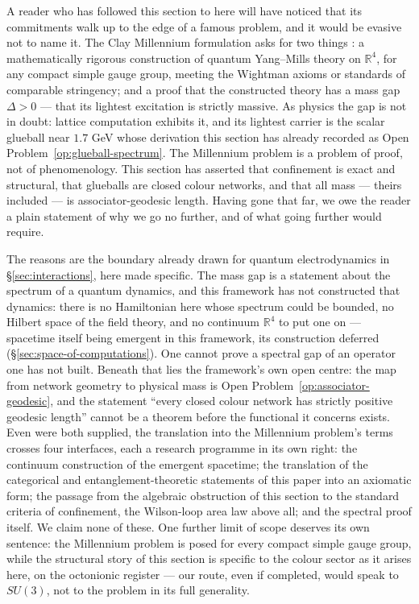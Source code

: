 A reader who has followed this section to here will have noticed that its commitments walk up to
the edge of a famous problem, and it would be evasive not to name it. The Clay Millennium
formulation asks for two things \autocite{jaffewitten2006}: a mathematically rigorous construction
of quantum Yang--Mills theory on $\mathbb{R}^{4}$, for any compact simple gauge group, meeting the
Wightman axioms or standards of comparable stringency; and a proof that the constructed theory has
a mass gap $\Delta > 0$ --- that its lightest excitation is strictly massive. As physics the gap is
not in doubt: lattice computation exhibits it, and its lightest carrier is the scalar glueball near
$1.7$ GeV whose derivation this section has already recorded as
Open Problem~\ref{op:glueball-spectrum}. The Millennium problem is a problem of proof, not of
phenomenology. This section has asserted that confinement is exact and structural, that glueballs
are closed colour networks, and that all mass --- theirs included --- is associator-geodesic length.
Having gone that far, we owe the reader a plain statement of why we go no further, and of what
going further would require.

The reasons are the boundary already drawn for quantum electrodynamics in \S\ref{sec:interactions},
here made specific. The mass gap is a statement about the spectrum of a quantum dynamics, and this
framework has not constructed that dynamics: there is no Hamiltonian here whose spectrum could be
bounded, no Hilbert space of the field theory, and no continuum $\mathbb{R}^{4}$ to put one on ---
spacetime itself being emergent in this framework, its construction deferred
(\S\ref{sec:space-of-computations}). One cannot prove a spectral gap of an operator one has not
built. Beneath that lies the framework's own open centre: the map from network geometry to physical
mass is Open Problem~\ref{op:associator-geodesic}, and the statement ``every closed colour network
has strictly positive geodesic length'' cannot be a theorem before the functional it concerns
exists. Even were both supplied, the translation into the Millennium problem's terms crosses four
interfaces, each a research programme in its own right: the continuum construction of the emergent
spacetime; the translation of the categorical and entanglement-theoretic statements of this paper
into an axiomatic form; the passage from the algebraic obstruction of this section to the standard
criteria of confinement, the Wilson-loop area law above all; and the spectral proof itself. We claim
none of these. One further limit of scope deserves its own sentence: the Millennium problem is posed
for every compact simple gauge group, while the structural story of this section is specific to the
colour sector as it arises here, on the octonionic register --- our route, even if completed, would
speak to $SU(3)$, not to the problem in its full generality.

